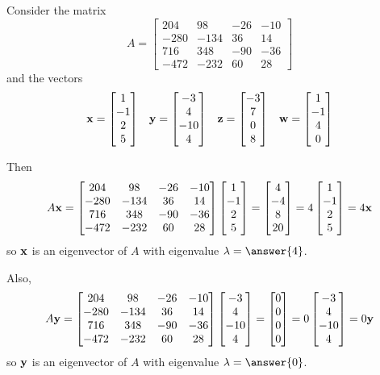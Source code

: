 \documentclass{ximera}
\begin{document}
\begin{example}
  Consider the matrix
  \[
    A=
    \begin{bmatrix}
      204 & 98 & -26 & -10\\
      -280 & -134 & 36 & 14\\
      716 & 348 & -90 & -36\\
      -472 & -232 & 60 & 28
    \end{bmatrix}
  \]
  and the vectors
  \begin{align*}
\vect{x}=\colvector{1\\-1\\2\\5}&&     %
\vect{y}=\colvector{-3\\4\\-10\\4}&&  %
\vect{z}=\colvector{-3\\7\\0\\8}&&     %
\vect{w}=\colvector{1\\-1\\4\\0}        %
\end{align*}

Then
\[
A\mathbf{x}=
\begin{bmatrix}
204 & 98 & -26 & -10\\
-280 & -134 & 36 & 14\\
716 & 348 & -90 & -36\\
-472 & -232 & 60 & 28
\end{bmatrix}
\begin{bmatrix}1\\-1\\2\\5\end{bmatrix}=
\begin{bmatrix}4\\-4\\8\\20\end{bmatrix}=
4\begin{bmatrix}1\\-1\\2\\5\end{bmatrix}=4\mathbf{x}
\]
so $\mathbf{x}$ is an eigenvector of $A$ with eigenvalue $\lambda=\answer{4}$.

Also,
\[
A\mathbf{y}=
\begin{bmatrix}
204 & 98 & -26 & -10\\
-280 & -134 & 36 & 14\\
716 & 348 & -90 & -36\\
-472 & -232 & 60 & 28
\end{bmatrix}
\begin{bmatrix}-3\\4\\-10\\4\end{bmatrix}=
\begin{bmatrix}0\\0\\0\\0\end{bmatrix}=
0\begin{bmatrix}-3\\4\\-10\\4\end{bmatrix}=0\mathbf{y}
\]
so $\mathbf{y}$ is an eigenvector of $A$ with eigenvalue $\lambda=\answer{0}$.


\end{example}
\end{document}
